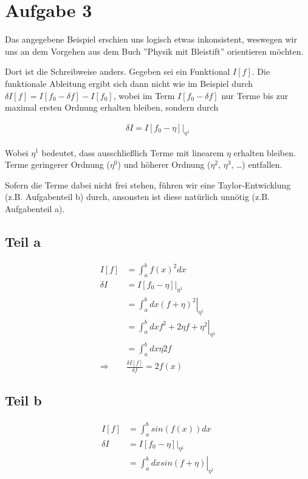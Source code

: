 \documentclass[a4paper,german,12pt,smallheadings]{scrartcl}
\begin{document}
\section*{Aufgabe 3}
Das angegebene Beispiel erschien uns logisch etwas inkonsistent, weswegen wir
uns an dem Vorgehen aus dem Buch ''Physik mit Bleistift'' orientieren möchten.

Dort ist die Schreibweise anders. Gegeben sei ein Funktional $I[f]$. Die
funktionale Ableitung ergibt sich dann nicht wie im Beispiel durch $\delta I[f]
= I[f_0 - \delta f] - I[f_0]$, wobei im Term $I[f_0 - \delta f]$ nur Terme bis
zur maximal ersten Ordnung erhalten bleiben, sondern durch

\begin{align*}
  \delta I = \left.I[f_0 - \eta]\right|_{\eta^1}
\end{align*}

Wobei $\eta^1$ bedeutet, dass ausschließlich Terme mit linearem $\eta$ erhalten
bleiben. Terme geringerer Ordnung ($\eta^0$) und höherer Ordnung ($\eta^2$,
$\eta^3$, \dots) entfallen.

Sofern die Terme dabei nicht frei stehen, führen wir eine Taylor-Entwicklung
(z.B. Aufgabenteil b) durch, ansonsten ist diese natürlich unnötig (z.B.
Aufgabenteil a).

\subsection*{Teil a}

\begin{align*}
  I[f] &= \int_a^b f(x)^2 dx \\
  \delta I &= \left.I[f_0 - \eta]\right|_{\eta^1} \\
  &=\left.\int_a^b dx (f+\eta)^2 \right|_{\eta^1} \\
  &=\left.\int_a^b dx f^2 + 2 \eta f + \eta^2 \right|_{\eta^1} \\
  &=\int_a^b dx \eta 2 f \\
  \Rightarrow& \frac{\delta I[f]}{\delta f} = 2f(x)
\end{align*}

\subsection*{Teil b}

\begin{align*}
  I[f] &= \int_a^b sin(f(x)) dx \\
  \delta I &= \left.I[f_0 - \eta]\right|_{\eta^1} \\
  &=\left.\int_a^b dx sin(f+\eta) \right|_{\eta^1}
\end{align*}
\end{document}
